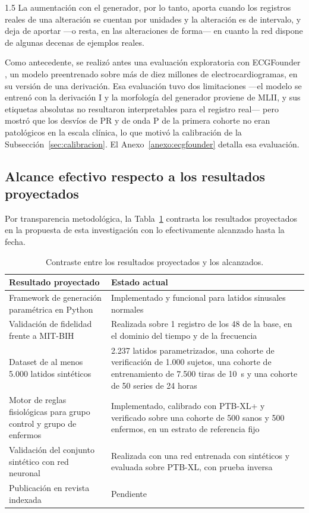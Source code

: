 \begin{spacing}{1.5}
La aumentación con el generador, por lo tanto, aporta cuando los registros reales de una alteración se cuentan por unidades y la alteración es de intervalo, y deja de aportar ---o resta, en las alteraciones de forma--- en cuanto la red dispone de algunas decenas de ejemplos reales.

Como antecedente, se realizó antes una evaluación exploratoria con ECGFounder \cite{li2025ecgfounder}, un modelo preentrenado sobre más de diez millones de electrocardiogramas, en su versión de una derivación. Esa evaluación tuvo dos limitaciones ---el modelo se entrenó con la derivación I y la morfología del generador proviene de MLII, y sus etiquetas absolutas no resultaron interpretables para el registro real--- pero mostró que los desvíos de PR y de onda P de la primera cohorte no eran patológicos en la escala clínica, lo que motivó la calibración de la Subsección~\ref{sec:calibracion}. El Anexo~\ref{anexo:ecgfounder} detalla esa evaluación.

\subsection{Alcance efectivo respecto a los resultados proyectados}

Por transparencia metodológica, la Tabla~\ref{tab:alcance} contrasta los resultados proyectados en la propuesta de esta investigación con lo efectivamente alcanzado hasta la fecha.

\begin{table}[H]
\centering
\begin{tabular}{|p{7cm}|p{6.5cm}|}
\hline
\textbf{Resultado proyectado} & \textbf{Estado actual} \\ \hline
Framework de generación paramétrica en Python & Implementado y funcional para latidos sinusales normales \\ \hline
Validación de fidelidad frente a MIT-BIH & Realizada sobre 1 registro de los 48 de la base, en el dominio del tiempo y de la frecuencia \\ \hline
Dataset de al menos 5.000 latidos sintéticos & 2.237 latidos parametrizados, una cohorte de verificación de 1.000 sujetos, una cohorte de entrenamiento de 7.500 tiras de 10~s y una cohorte de 50 series de 24 horas \\ \hline
Motor de reglas fisiológicas para grupo control y grupo de enfermos & Implementado, calibrado con PTB-XL+ y verificado sobre una cohorte de 500 sanos y 500 enfermos, en un estrato de referencia fijo \\ \hline
Validación del conjunto sintético con red neuronal & Realizada con una red entrenada con sintéticos y evaluada sobre PTB-XL, con prueba inversa \\ \hline
Publicación en revista indexada & Pendiente \\ \hline
\end{tabular}
\caption{Contraste entre los resultados proyectados y los alcanzados.}
\label{tab:alcance}
\end{table}


\end{spacing}
